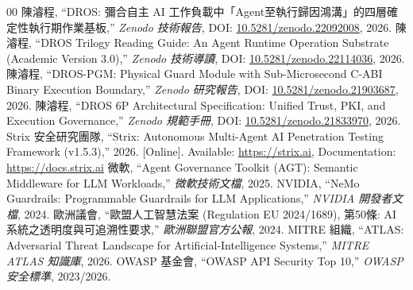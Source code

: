 \documentclass[conference]{IEEEtran}
\begin{document}
\begin{thebibliography}{00}
 陳濬程, ``DROS: 彌合自主 AI 工作負載中「Agent至執行歸因鴻溝」的四層確定性執行期作業基板,'' \textit{Zenodo 技術報告}, DOI: \href{https://doi.org/10.5281/zenodo.22092008}{10.5281/zenodo.22092008}, 2026.
 陳濬程, ``DROS Trilogy Reading Guide: An Agent Runtime Operation Substrate (Academic Version 3.0),'' \textit{Zenodo 技術導讀}, DOI: \href{https://doi.org/10.5281/zenodo.22114036}{10.5281/zenodo.22114036}, 2026.
 陳濬程, ``DROS-PGM: Physical Guard Module with Sub-Microsecond C-ABI Binary Execution Boundary,'' \textit{Zenodo 研究報告}, DOI: \href{https://doi.org/10.5281/zenodo.21903687}{10.5281/zenodo.21903687}, 2026.
 陳濬程, ``DROS 6P Architectural Specification: Unified Trust, PKI, and Execution Governance,'' \textit{Zenodo 規範手冊}, DOI: \href{https://doi.org/10.5281/zenodo.21833970}{10.5281/zenodo.21833970}, 2026.
 Strix 安全研究團隊, ``Strix: Autonomous Multi-Agent AI Penetration Testing Framework (v1.5.3),'' 2026. [Online]. Available: \url{https://strix.ai}, Documentation: \url{https://docs.strix.ai}
 微軟, ``Agent Governance Toolkit (AGT): Semantic Middleware for LLM Workloads,'' \textit{微軟技術文檔}, 2025.
 NVIDIA, ``NeMo Guardrails: Programmable Guardrails for LLM Applications,'' \textit{NVIDIA 開發者文檔}, 2024.
 歐洲議會, ``歐盟人工智慧法案 (Regulation EU 2024/1689), 第50條: AI系統之透明度與可追溯性要求,'' \textit{歐洲聯盟官方公報}, 2024.
 MITRE 組織, ``ATLAS: Adversarial Threat Landscape for Artificial-Intelligence Systems,'' \textit{MITRE ATLAS 知識庫}, 2026.
 OWASP 基金會, ``OWASP API Security Top 10,'' \textit{OWASP 安全標準}, 2023/2026.
\end{thebibliography}
\end{document}
